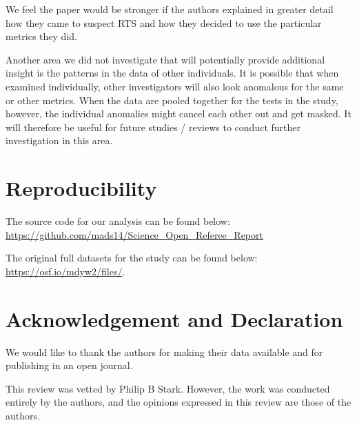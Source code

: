 \documentclass[11pt]{article}
\begin{document}
We feel the paper would be stronger if the authors explained in greater detail how they came to suspect RTS and how they decided to use the particular metrics they did.

Another area we did not investigate that will potentially provide additional insight is the patterns in the data of other individuals. It is possible that when examined individually, other investigators will also look anomalous for the same or other metrics. When the data are pooled together for the tests in the study, however, the individual anomalies might cancel each other out and get masked. It will therefore be useful for future studies / reviews to conduct further investigation in this area.

\section*{Reproducibility}
The source code for our analysis can be found below:\\ \url{https://github.com/mads14/Science_Open_Referee_Report}

The original full datasets for the study can be found below:\\ \url{https://osf.io/mdyw2/files/}.

\section*{Acknowledgement and Declaration}
We would like to thank the authors for making their data available and for publishing in an open journal.

This review was vetted by Philip B Stark. However, the work was conducted entirely by the authors, and the opinions expressed in this review are those of the authors.



\end{document}
